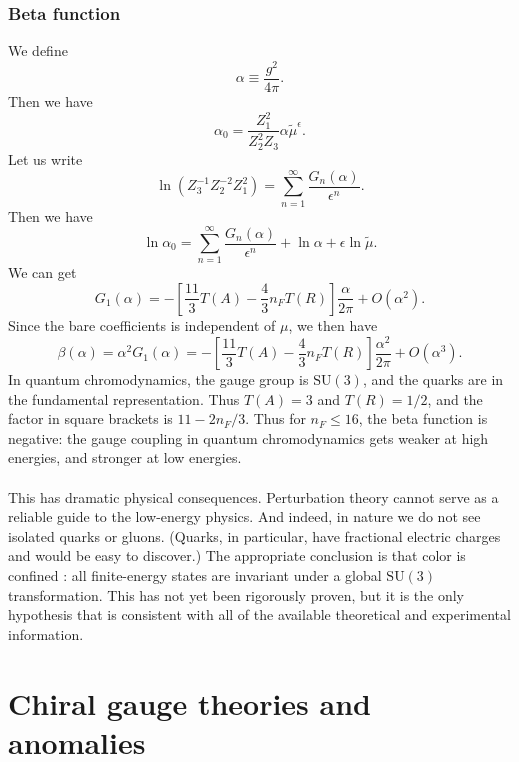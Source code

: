 \subsubsection{Beta function}
We define
\[\alpha \equiv \frac{g^2}{4\pi}.\]
Then we have
\[\alpha_0 = \frac{Z_1^2}{Z_2^2 Z_3} \alpha \tilde{\mu}^{\epsilon}.\]
Let us write
\[\ln \left( Z_3^{-1}Z_2^{-2}Z_1^2 \right) = \sum_{n=1}^{\infty} \frac{G_n(\alpha)}{\epsilon^n}.\]
Then we have
\[\ln \alpha_0 = \sum_{n=1}^{\infty} \frac{G_n(\alpha)}{\epsilon^n} + \ln \alpha + \epsilon \ln \tilde{\mu}.\]
We can get
\[G_1(\alpha) = - \left[ \frac{11}{3}T(A) - \frac{4}{3} n_F T(R) \right] \frac{\alpha}{2\pi} + O(\alpha^2).\]
Since the bare coefficients is independent of $\mu$, we then have
\[\beta(\alpha) = \alpha^2 G_1(\alpha) = - \left[ \frac{11}{3}T(A) - \frac{4}{3} n_F T(R) \right] \frac{\alpha^2}{2\pi} + O(\alpha^3).\]
In quantum chromodynamics, the gauge group is $\mathrm{SU}(3)$, and the quarks are in the fundamental representation. Thus $T(A) = 3$ and $T(R) = {1}/{2}$, and the factor in square brackets is $11 - {2n_F}/{3} $. 
Thus for $n_F \leq 16$, the beta function is negative: the gauge coupling in quantum chromodynamics gets weaker at high energies, and stronger at low energies.
\\ \\
This has dramatic physical consequences. Perturbation theory cannot serve as a reliable guide to the low-energy physics. And indeed, in nature we do not see isolated quarks or gluons. (Quarks, in particular, have fractional electric charges and would be easy to discover.) The appropriate conclusion is that color is confined : all finite-energy states are invariant under a global $\mathrm{SU}(3)$ transformation. This has not yet been rigorously proven, but it is the
only hypothesis that is consistent with all of the available theoretical and experimental information.

\section{Chiral gauge theories and anomalies}
